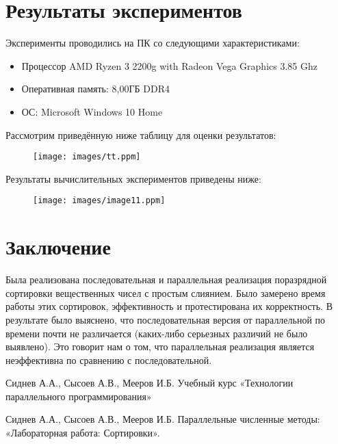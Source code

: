 \documentclass{report}
\begin{document}
\section*{Результаты экспериментов}
Эксперименты проводились на ПК со следующими характеристиками:

\begin{itemize}
\item Процессор AMD Ryzen 3 2200g with Radeon Vega Graphics 3.85 Ghz
\item Оперативная память: 8,00ГБ DDR4
\item ОС: Microsoft Windows 10 Home
\end{itemize}

\par Рассмотрим приведённую ниже таблицу для оценки результатов:
\\


\begin{figure}[htp]
    \centering
    \texttt{[image: images/tt.ppm]}
    \label{fig:galaxy}
\end{figure}


\par Результаты вычислительных экспериментов приведены ниже:

\begin{figure}[htp]
    \centering
    \texttt{[image: images/image11.ppm]}
    \label{fig:galaxy}
\end{figure}

\newpage

\section*{Заключение}
\par Была реализована последовательная и параллельная реализация поразрядной сортировки вещественных чисел с простым слиянием. Было замерено время работы этих сортировок, эффективность и протестирована их корректность. В результате было выяснено, что последовательная версия от параллельной по времени почти не различается (каких-либо серьезных различий не было выявлено). Это говорит нам о том, что параллельная реализация является неэффективна по сравнению с последовательной.

\newpage

\begin{thebibliography}{1}

Сиднев А.А., Сысоев А.В., Мееров И.Б. Учебный курс «Технологии параллельного программирования»

Сиднев А.А., Сысоев А.В., Мееров И.Б. Параллельные численные методы: «Лабораторная работа: Сортировки».

\end{thebibliography}
\newpage
\end{document}
